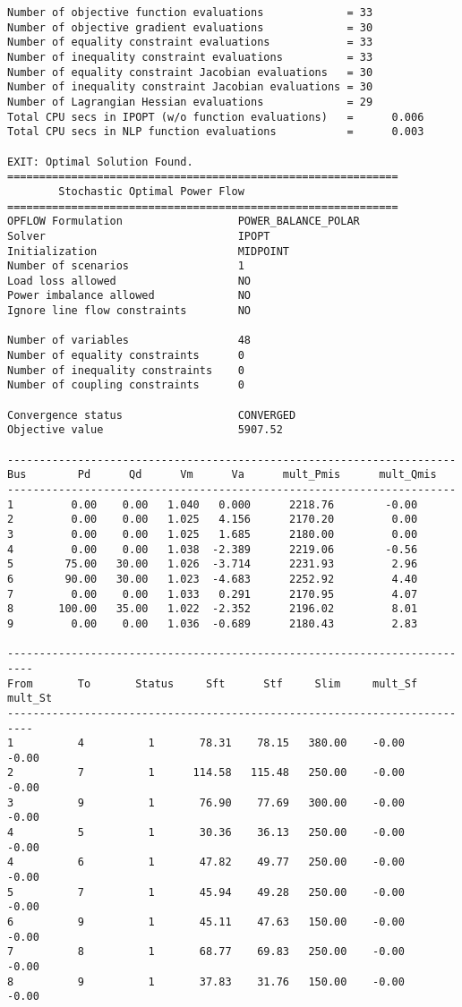 \begin{lstlisting}
Number of objective function evaluations             = 33
Number of objective gradient evaluations             = 30
Number of equality constraint evaluations            = 33
Number of inequality constraint evaluations          = 33
Number of equality constraint Jacobian evaluations   = 30
Number of inequality constraint Jacobian evaluations = 30
Number of Lagrangian Hessian evaluations             = 29
Total CPU secs in IPOPT (w/o function evaluations)   =      0.006
Total CPU secs in NLP function evaluations           =      0.003

EXIT: Optimal Solution Found.
=============================================================
        Stochastic Optimal Power Flow
=============================================================
OPFLOW Formulation                  POWER_BALANCE_POLAR
Solver                              IPOPT
Initialization                      MIDPOINT
Number of scenarios                 1
Load loss allowed                   NO
Power imbalance allowed             NO
Ignore line flow constraints        NO

Number of variables                 48
Number of equality constraints      0
Number of inequality constraints    0
Number of coupling constraints      0

Convergence status                  CONVERGED
Objective value                     5907.52

----------------------------------------------------------------------
Bus        Pd      Qd      Vm      Va      mult_Pmis      mult_Qmis
----------------------------------------------------------------------
1         0.00    0.00   1.040   0.000      2218.76        -0.00
2         0.00    0.00   1.025   4.156      2170.20         0.00
3         0.00    0.00   1.025   1.685      2180.00         0.00
4         0.00    0.00   1.038  -2.389      2219.06        -0.56
5        75.00   30.00   1.026  -3.714      2231.93         2.96
6        90.00   30.00   1.023  -4.683      2252.92         4.40
7         0.00    0.00   1.033   0.291      2170.95         4.07
8       100.00   35.00   1.022  -2.352      2196.02         8.01
9         0.00    0.00   1.036  -0.689      2180.43         2.83

--------------------------------------------------------------------------
From       To       Status     Sft      Stf     Slim     mult_Sf  mult_St
--------------------------------------------------------------------------
1          4          1       78.31    78.15   380.00    -0.00    -0.00
2          7          1      114.58   115.48   250.00    -0.00    -0.00
3          9          1       76.90    77.69   300.00    -0.00    -0.00
4          5          1       30.36    36.13   250.00    -0.00    -0.00
4          6          1       47.82    49.77   250.00    -0.00    -0.00
5          7          1       45.94    49.28   250.00    -0.00    -0.00
6          9          1       45.11    47.63   150.00    -0.00    -0.00
7          8          1       68.77    69.83   250.00    -0.00    -0.00
8          9          1       37.83    31.76   150.00    -0.00    -0.00


\end{lstlisting}
